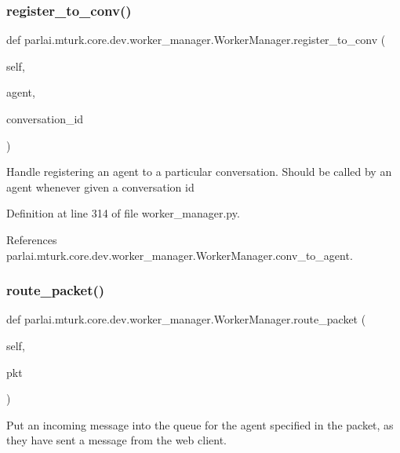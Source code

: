 \subsubsection{\texorpdfstring{register\+\_\+to\+\_\+conv()}{register\_to\_conv()}}
{\footnotesize\ttfamily def parlai.\+mturk.\+core.\+dev.\+worker\+\_\+manager.\+Worker\+Manager.\+register\+\_\+to\+\_\+conv (\begin{DoxyParamCaption}\item[{}]{self,  }\item[{}]{agent,  }\item[{}]{conversation\+\_\+id }\end{DoxyParamCaption})}

\begin{DoxyVerb}Handle registering an agent to a particular conversation.
Should be called by an agent whenever given a conversation id
\end{DoxyVerb}
 

Definition at line 314 of file worker\+\_\+manager.\+py.



References parlai.\+mturk.\+core.\+dev.\+worker\+\_\+manager.\+Worker\+Manager.\+conv\+\_\+to\+\_\+agent.

\mbox{\label{classparlai_1_1mturk_1_1core_1_1dev_1_1worker__manager_1_1WorkerManager_a64541274656cb7cc6890da1625c0bb2b}} 
\subsubsection{\texorpdfstring{route\+\_\+packet()}{route\_packet()}}
{\footnotesize\ttfamily def parlai.\+mturk.\+core.\+dev.\+worker\+\_\+manager.\+Worker\+Manager.\+route\+\_\+packet (\begin{DoxyParamCaption}\item[{}]{self,  }\item[{}]{pkt }\end{DoxyParamCaption})}

\begin{DoxyVerb}Put an incoming message into the queue for the agent specified in
the packet, as they have sent a message from the web client.
\end{DoxyVerb}
 

